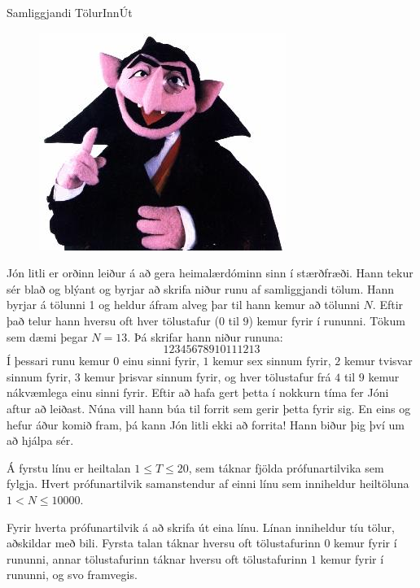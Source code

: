 \begin{problem}{Samliggjandi Tölur}{Inn}{Út}{~}{~}

	\begin{figure}
		\vspace{-25pt}
		\begin{center}
			\includegraphics[scale=0.53]{../SamliggjandiTolur/count.jpg}
		\end{center}
		\vspace{-30pt}
	\end{figure}

	Jón litli er orðinn leiður á að gera heimalærdóminn sinn í stærðfræði. Hann tekur sér blað og blýant og byrjar að skrifa niður runu af samliggjandi tölum. Hann byrjar á tölunni 1 og heldur áfram alveg þar til hann kemur að tölunni $N$. Eftir það telur hann hversu oft hver tölustafur ($0$ til $9$) kemur fyrir í rununni. Tökum sem dæmi þegar $N = 13$. Þá skrifar hann niður rununa:
	\[12345678910111213\]
	Í þessari runu kemur $0$ einu sinni fyrir, $1$ kemur sex sinnum fyrir, $2$ kemur tvisvar sinnum fyrir, $3$ kemur þrisvar sinnum fyrir, og hver tölustafur frá $4$ til $9$ kemur nákvæmlega einu sinni fyrir. Eftir að hafa gert þetta í nokkurn tíma fer Jóni aftur að leiðast. Núna vill hann búa til forrit sem gerir þetta fyrir sig. En eins og hefur áður komið fram, þá kann Jón litli ekki að forrita! Hann biður þig því um að hjálpa sér.

	\Input

		Á fyrstu línu er heiltalan $1 \leq T \leq 20$, sem táknar fjölda prófunartilvika sem fylgja. Hvert prófunartilvik samanstendur af einni línu sem inniheldur heiltöluna $1 < N \leq 10000$.

	\Output

		Fyrir hverta prófunartilvik á að skrifa út eina línu. Línan inniheldur tíu tölur, aðskildar með bili. Fyrsta talan táknar hversu oft tölustafurinn $0$ kemur fyrir í rununni, annar tölustafurinn táknar hversu oft tölustafurinn $1$ kemur fyrir í rununni, og svo framvegis.

	\Examples

\begin{example}
%
\end{example}

\end{problem}